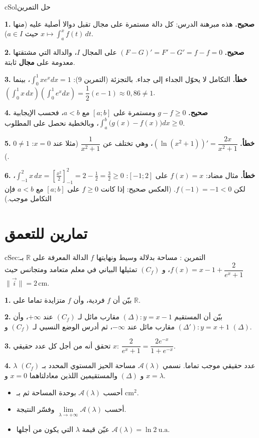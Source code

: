 \documentclass[12pt,a4paper]{article}
\newenvironment{BOX}[2]{\begin{otherlanguage}{english}\begin{arbox}{#1}{#2}}{\end{arbox}\end{otherlanguage}}
\newcounter{exo}
\newenvironment{tamrin}[1]{\stepcounter{exo}\begin{BOX}{cSec}{التمرين \theexo: #1}}{\end{BOX}}
\newenvironment{hal}{\Needspace{12\baselineskip}\begin{otherlanguage}{english}\begin{arbox}[breakable]{cSol}{حل التمرين \theexo}}{\end{arbox}\end{otherlanguage}}
\newcommand{\R}{\mathbb{R}}
\newenvironment{sq}{\begin{itemize}[leftmargin=2.4em,itemsep=3pt]}{\end{itemize}}
\newcommand{\qa}{\item[(أ)]}\newcommand{\qb}{\item[(ب)]}\newcommand{\qc}{\item[(جـ)]}\newcommand{\qd}{\item[(د)]}\newcommand{\qe}{\item[(هـ)]}
\newcommand{\QQ}[1]{\par\smallskip\textbf{#1.} }
\begin{document}
\begin{hal}
\QQ{1} \textbf{صحيح.} هذه مبرهنة الدرس: كل دالة مستمرة على مجال تقبل دوالا أصلية عليه (منها $x\mapsto\int_a^xf(t)\,dt$ حيث $a\in I$).

\QQ{2} \textbf{صحيح.} $(F-G)'=F'-G'=f-f=0$ على المجال $I$، والدالة التي مشتقتها معدومة على \textbf{مجال} ثابتة.

\QQ{3} \textbf{خطأ.} التكامل لا يحوّل الجداء إلى جداء. بالتجزئة (التمرين 9): $\displaystyle\int_0^1xe^{x}dx=1$، بينما
$\left(\displaystyle\int_0^1x\,dx\right)\left(\int_0^1e^{x}dx\right)=\dfrac12(e-1)\approx0{,}86\neq1$.

\QQ{4} \textbf{صحيح.} $g-f\geqslant0$ ومستمرة على $[a;b]$ مع $a<b$، فحسب الإيجابية $\displaystyle\int_a^b\big(g(x)-f(x)\big)dx\geqslant0$، وبالخطية نحصل على المطلوب.

\QQ{5} \textbf{خطأ.} $\left(\ln\left(x^{2}+1\right)\right)'=\dfrac{2x}{x^{2}+1}$، وهي تختلف عن $\dfrac{1}{x^{2}+1}$ (مثلا عند $x=0$: $0\neq1$).

\QQ{6} \textbf{خطأ.} مثال مضاد: $f(x)=x$ على $[-1;2]$: $\displaystyle\int_{-1}^{2}x\,dx=\left[\frac{x^{2}}{2}\right]_{-1}^{2}=2-\frac12=\frac32\geqslant0$، لكن $f(-1)=-1<0$.
(العكس صحيح: إذا كانت $f\geqslant0$ على $[a;b]$ مع $a<b$ فإن التكامل موجب.)
\end{hal}

\section{تمارين للتعمق}

\begin{tamrin}{مساحة بدلالة وسيط ونهايتها}
$f$ الدالة المعرفة على $\R$ بـ: $f(x)=x-1+\dfrac{2}{e^{x}+1}$، و $(C_f)$ تمثيلها البياني في معلم متعامد ومتجانس حيث $\|\vec i\|=2\,\text{cm}$.
\QQ{1} بيّن أن $f$ فردية، وأن $f$ متزايدة تماما على $\R$.
\QQ{2} بيّن أن المستقيم $(\Delta):y=x-1$ مقارب مائل لـ $(C_f)$ عند $+\infty$، وأن $(\Delta'):y=x+1$ مقارب مائل عند $-\infty$، ثم أدرس الوضع النسبي لـ $(C_f)$ و $(\Delta)$.
\QQ{3} تحقق أنه من أجل كل عدد حقيقي $x$: $\dfrac{2}{e^{x}+1}=\dfrac{2e^{-x}}{1+e^{-x}}$.
\QQ{4} $\lambda$ عدد حقيقي موجب تماما. نسمي $\mathcal{A}(\lambda)$ مساحة الحيز المستوي المحدد بـ $(C_f)$ و $(\Delta)$ والمستقيمين اللذين معادلتاهما $x=0$ و $x=\lambda$.
\begin{sq}
\qa أحسب $\mathcal{A}(\lambda)$ بوحدة المساحة ثم بـ $\text{cm}^{2}$.
\qb أحسب $\lim\limits_{\lambda\to+\infty}\mathcal{A}(\lambda)$ وفسّر النتيجة.
\qc عيّن قيمة $\lambda$ التي يكون من أجلها $\mathcal{A}(\lambda)=\ln2\ \mathrm{u.a}$.
\end{sq}
\end{tamrin}
\end{document}
